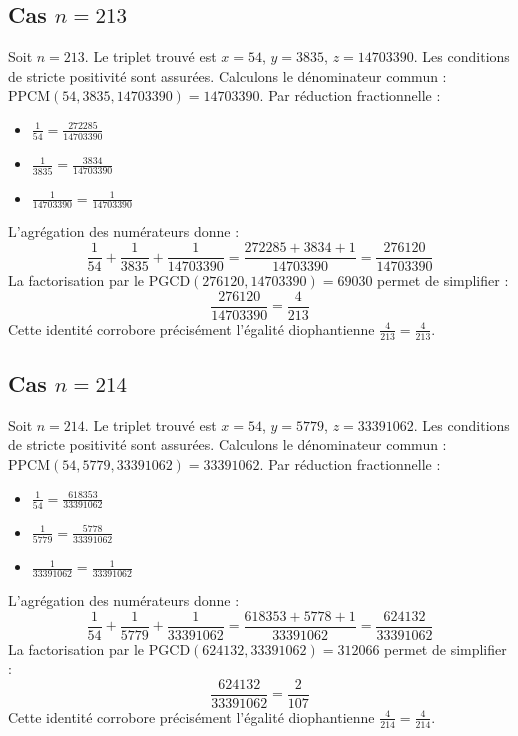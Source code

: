 \documentclass[11pt,a4paper]{article}
\begin{document}
\subsection{Cas $n = 213$}
Soit $n = 213$. Le triplet trouvé est $x = 54$, $y = 3835$, $z = 14703390$.
Les conditions de stricte positivité sont assurées.
Calculons le dénominateur commun : $\text{PPCM}(54, 3835, 14703390) = 14703390$.
Par réduction fractionnelle :
\begin{itemize}
    \item $\frac{1}{54} = \frac{272285}{14703390}$
    \item $\frac{1}{3835} = \frac{3834}{14703390}$
    \item $\frac{1}{14703390} = \frac{1}{14703390}$
\end{itemize}
L'agrégation des numérateurs donne :
$$ \frac{1}{54} + \frac{1}{3835} + \frac{1}{14703390} = \frac{272285 + 3834 + 1}{14703390} = \frac{276120}{14703390} $$
La factorisation par le $\text{PGCD}(276120, 14703390) = 69030$ permet de simplifier :
$$ \frac{276120}{14703390} = \frac{4}{213} $$
Cette identité corrobore précisément l'égalité diophantienne $\frac{4}{213} = \frac{4}{213}$.

\subsection{Cas $n = 214$}
Soit $n = 214$. Le triplet trouvé est $x = 54$, $y = 5779$, $z = 33391062$.
Les conditions de stricte positivité sont assurées.
Calculons le dénominateur commun : $\text{PPCM}(54, 5779, 33391062) = 33391062$.
Par réduction fractionnelle :
\begin{itemize}
    \item $\frac{1}{54} = \frac{618353}{33391062}$
    \item $\frac{1}{5779} = \frac{5778}{33391062}$
    \item $\frac{1}{33391062} = \frac{1}{33391062}$
\end{itemize}
L'agrégation des numérateurs donne :
$$ \frac{1}{54} + \frac{1}{5779} + \frac{1}{33391062} = \frac{618353 + 5778 + 1}{33391062} = \frac{624132}{33391062} $$
La factorisation par le $\text{PGCD}(624132, 33391062) = 312066$ permet de simplifier :
$$ \frac{624132}{33391062} = \frac{2}{107} $$
Cette identité corrobore précisément l'égalité diophantienne $\frac{4}{214} = \frac{4}{214}$.
\end{document}
